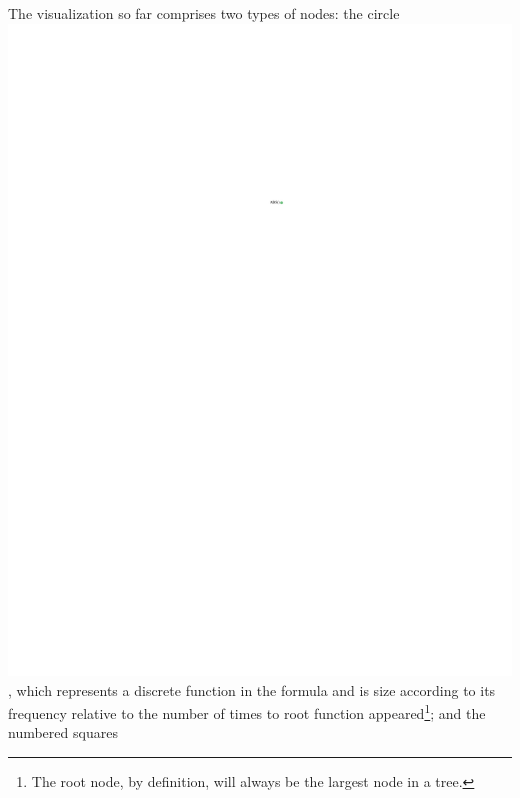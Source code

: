 \documentclass[conference]{IEEEtran}
\begin{document}
	The visualization so far comprises two types of nodes: the circle
	\includegraphics{glossary-greenonly}, which represents a discrete function in
	the formula and is size according to its frequency relative to the number of
	times to root function appeared\footnote{The root node, by definition, will
		always be the largest node in a tree.}; and the numbered squares
\end{document}
